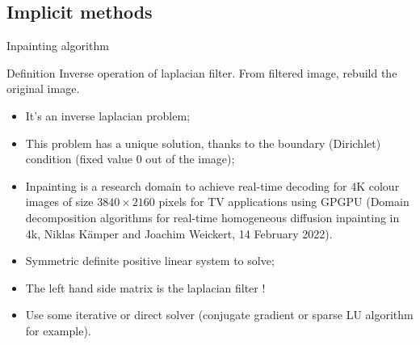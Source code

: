 \documentclass[compress,10pt,aspectratio=169]{beamer}
\begin{document}
\subsection{Implicit methods}

\begin{frame}[fragile]{Inpainting algorithm}
  \scriptsize
  \begin{block}{\small Definition}
    Inverse operation of laplacian filter. From filtered image, rebuild the original image.

    \begin{itemize}
    \item It's an inverse laplacian problem;
    \item This problem has a unique solution, thanks to the boundary (Dirichlet) condition (fixed value 0 out of the image);
    \item Inpainting is a research domain to achieve real-time decoding for 4K colour images of size $3840\times 2160$ pixels for TV applications using GPGPU (Domain decomposition algorithms for real-time homogeneous diffusion inpainting in 4k, Niklas Kämper and Joachim Weickert, 14 February 2022).
    \item Symmetric definite positive linear system to solve;
    \item The left hand side matrix is the laplacian filter !
    \item Use some iterative or direct solver (conjugate gradient or sparse LU algorithm for example).
    \end{itemize}
  \end{block}
\end{frame}
\end{document}
